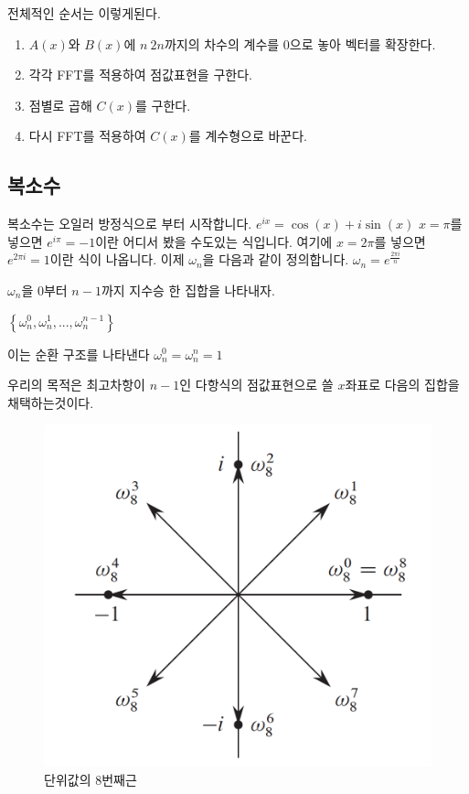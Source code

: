 전체적인 순서는 이렇게된다.
\begin{enumerate}
    \item $A(x)$와 $B(x)$에 $n~2n$까지의 차수의 계수를 0으로 놓아 벡터를 확장한다.
    \item 각각 FFT를 적용하여 점값표현을 구한다.
    \item 점별로 곱해 $C(x)$를 구한다.
    \item 다시 FFT를 적용하여 $C(x)$를 계수형으로 바꾼다.
\end{enumerate}




\subsection{복소수}
복소수는 오일러 방정식으로 부터 시작합니다.
$e^{ix} = \cos(x) +i\sin(x)$
$x = \pi$를 넣으면 $e^{i\pi} = -1$이란 어디서 봤을 수도있는 식입니다.
여기에 $x = 2\pi$를 넣으면 $e^{2\pi i} = 1$이란 식이 나옵니다. 
이제 $\omega_n$을 다음과 같이 정의합니다.
$\omega_n = e^{\frac{2\pi i}{n}}$ 

$\omega_n$을 $0$부터 $n-1$까지 지수승 한 집합을 나타내자.

$\left\{\omega_n^0,\omega_n^1, ... , \omega_n^{n-1} \right\}$

이는 순환 구조를 나타낸다 
$\omega_n ^0 = \omega_n^n = 1$

우리의 목적은 최고차항이 $n-1$인 다항식의 점값표현으로 쓸 $x$좌표로 다음의 집합을 채택하는것이다.


\begin{figure}[h!]
    \centering
    \includegraphics[scale=0.3]{./FFT/pic/pic2.png}
    \caption{단위값의 8번째근}
\end{figure}

